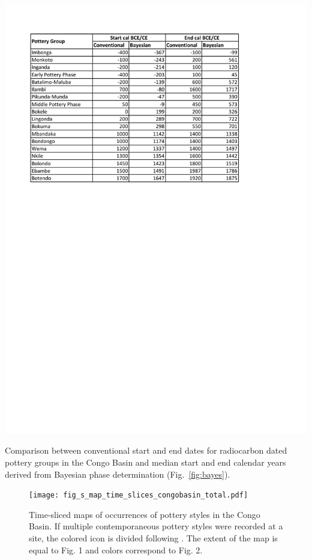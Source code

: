\documentclass[]{article}
\begin{document}
\begin{table}[H]
	\centering
	\includegraphics[width=\textwidth]{tbl_bayesphases_comparison.pdf}
	\caption{Comparison between conventional start and end dates for radiocarbon dated pottery groups in the Congo Basin \citep[Data S2]{Seidensticker.2021} and median start and end calendar years derived from Bayesian phase determination (Fig.~\ref{fig:bayes}).}
	\label{tab:bayes}
\end{table}

\begin{figure}[H]
	\centering
	\texttt{[image: fig\_s\_map\_time\_slices\_congobasin\_total.pdf]}
	\caption{Time-sliced maps of occurrences of pottery styles in the Congo Basin. If multiple contemporaneous pottery styles were recorded at a site, the colored icon is divided following \citet[218--244 Fig.~100--107]{Seidensticker.2021e}. The extent of the map is equal to Fig. 1 and colors correspond to Fig. 2.}
	\label{fig:timeslices_overview}
\end{figure}



\end{document}
